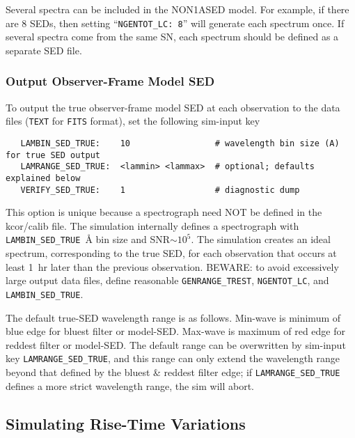 \documentclass[12pt]{article}
\begin{document}
Several spectra can be included in the NON1ASED model.
For example, if there are 8 SEDs, then setting 
``{\tt NGENTOT\_LC: 8}'' will generate each spectrum once.
If several spectra come from the same SN,
each spectrum should be defined as a separate SED file.


\subsubsection{Output Observer-Frame Model SED}
\label{sss:modelSED}

To output the true observer-frame model SED at each observation
to the data files ({\tt TEXT} for {\tt FITS} format),
set the following sim-input key
 \begin{verbatim}
   LAMBIN_SED_TRUE:    10                 # wavelength bin size (A) for true SED output
   LAMRANGE_SED_TRUE:  <lammin> <lammax>  # optional; defaults explained below
   VERIFY_SED_TRUE:    1                  # diagnostic dump
\end{verbatim}
%
This option is unique because
a spectrograph need NOT be defined in the kcor/calib file.
The simulation internally defines a spectrograph with 
{\tt LAMBIN\_SED\_TRUE}~{\AA} bin size and SNR${\sim}10^5$. 
The simulation creates an ideal spectrum,
corresponding to the true SED, for each observation
that occurs at least 1~hr later than the previous observation.
BEWARE: to avoid excessively large output data files,
define reasonable {\tt GENRANGE\_TREST}, {\tt NGENTOT\_LC},
and {\tt LAMBIN\_SED\_TRUE}.

The default true-SED wavelength range is as follows. Min-wave is minimum
of blue edge for bluest filter or model-SED. 
Max-wave is maximum of red edge for reddest filter or model-SED.
The default range can be overwritten by sim-input key {\tt LAMRANGE\_SED\_TRUE},
and this range can only extend the wavelength range beyond that defined
by the bluest \& reddest filter edge; if {\tt LAMRANGE\_SED\_TRUE}
defines a more strict wavelength range, the sim will abort.



\subsection{Simulating Rise-Time Variations}
\label{subsec:simRiseTime}
\end{document}
